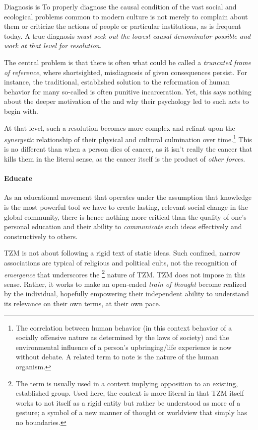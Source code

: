 \documentclass[10pt, a4paper, cleardoubleempty, openright, twoside]{book}
\begin{document}
Diagnosis is  To properly diagnose the causal condition of the vast social
and ecological problems common to modern culture is not merely to
complain about them or criticize the actions of people or particular
institutions, as is frequent today. A true diagnosis \emph{must seek out
the lowest causal denominator possible and work at that level for
resolution}.

The central problem is that there is often what could be called a
\emph{truncated frame of reference}, where shortsighted, misdiagnosis of
given consequences persist. For instance, the traditional, established
solution to the reformation of human behavior for many so-called
 is often punitive incarceration. Yet, this
says nothing about the deeper motivation of the  and
why their psychology led to such acts to begin with. 

At that level, such a resolution becomes more complex and reliant upon
the \emph{synergetic} relationship of their physical and cultural
culmination over time.\footnote{
	The correlation between human behavior (in this context behavior of a
	socially offensive nature as determined by the laws of society) and
	the environmental influence of a person's upbringing/life experience
	is now without debate. A related term to note is the
	 nature of the human organism.
}
This is no different than when a person dies of cancer, as it isn't
really the cancer that kills them in the literal sense, as the cancer
itself is the product of \emph{other forces}.

\paragraph {Educate}

As an educational movement that operates under the assumption that
knowledge is the most powerful tool we have to create lasting, relevant
social change in the global community, there is hence nothing more
critical than the quality of one's personal education and their ability
to \emph{communicate} such ideas effectively and constructively to
others. 

TZM is not about following a rigid text of static ideas. Such confined,
narrow associations are typical of religious and political cults, not
the recognition of \emph{emergence} that underscores the \footnote{
	The term  is usually used in a context
	implying opposition to an existing, established group. Used here, the
	context is more literal in that TZM itself works to not
	 itself as a rigid entity but rather be
	understood as more of a gesture; a symbol of a new manner of thought
	or worldview that simply has no boundaries.
}
nature of TZM. TZM does not impose in this sense. Rather, it works to
make an open-ended \emph{train of thought} become realized by the
individual, hopefully empowering their independent ability to understand
its relevance on their own terms, at their own pace.
\end{document}
